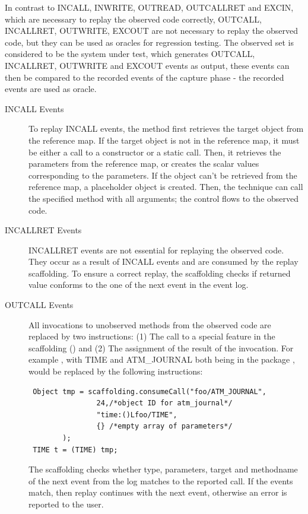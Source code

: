 In contrast to INCALL, INWRITE, OUTREAD, OUTCALLRET and EXCIN, which are necessary to replay the observed code correctly, OUTCALL, INCALLRET, OUTWRITE, EXCOUT are not necessary to replay the observed code, but they can be used as oracles for regression testing. The observed set is considered to be the system under test, which generates OUTCALL, INCALLRET, OUTWRITE and EXCOUT events as output, these events can then be compared to the recorded events of the capture phase - the recorded events are used as oracle.

\begin{description}
 \item [INCALL Events] To replay INCALL events, the method first retrieves the target object from the reference map. If the target object is not in the reference map, it must be either a call to a constructor or a static call. Then, it retrieves the parameters from the reference map, or creates the scalar values corresponding to the parameters. If the object can't be retrieved from the reference map, a placeholder object is created. Then, the technique can call the specified method with all arguments; the control flows to the observed code. 
 \item [INCALLRET Events] INCALLRET events are not essential for replaying the observed code. They occur as a result of INCALL events and are consumed by the replay scaffolding. To ensure a correct replay, the scaffolding checks if returned value conforms to the one of the next event in the event log.
 \item [OUTCALL Events] All invocations to unobserved methods from the observed code are replaced by two instructions: (1) The call to a special feature in the scaffolding () and (2) The assignment of the result of the invocation. For example , with TIME and ATM\_JOURNAL both being in the package , would be replaced by the following instructions:
\begin{lstlisting}
 Object tmp = scaffolding.consumeCall("foo/ATM_JOURNAL",
                24,/*object ID for atm_journal*/
                "time:()Lfoo/TIME",
                {} /*empty array of parameters*/
		);
 TIME t = (TIME) tmp;
\end{lstlisting}
The scaffolding checks whether type, parameters, target and methodname of the next event from the log matches to the reported call. If the events match, then replay continues with the next event, otherwise an error is reported to the user.

\end{description}
